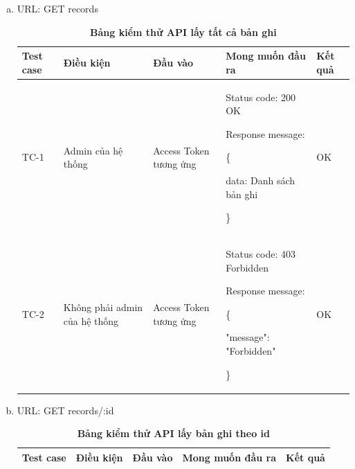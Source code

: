 \begin{enumerate}[a)]
  \item URL: GET records
    \begin{xltabular}{\textwidth}{
    | >{\raggedright\arraybackslash}p{1cm}
    | >{\raggedright\arraybackslash}p{2.5cm}
    | >{\raggedright\arraybackslash}p{2.5cm}
    | >{\raggedright\arraybackslash}X
    | >{\raggedright\arraybackslash}p{1cm}|
    }
    \caption{\bfseries \fontsize{12pt}{0pt}\selectfont Bảng kiểm thử API lấy tất cả bản ghi}
    \\
    \hline
    \bfseries Test case    &\bfseries Điều kiện   &\bfseries Đầu vào 
    &\bfseries Mong muốn đầu ra &\bfseries Kết quả\\ \hline
  
  
    TC-1
    & Admin của hệ thống
    & Access Token tương ứng
  
    & 
  
    Status code: 200 OK
  
      Response message:
  
      \{

    data: Danh sách bản ghi 
  
    \}
    
    & OK
  
    \\ \hline
  
    TC-2
    & Không phải admin của hệ thống
    & Access Token tương ứng
  
    & 
  
    Status code: 403 Forbidden
  
      Response message:
  
      \{

    "message": "Forbidden"
  
    \}
    
    & OK
    \\ \hline

  
    \end{xltabular}
  
  \item URL: GET records/{:id}
    \begin{xltabular}{\textwidth}{
    | >{\raggedright\arraybackslash}p{1cm}
    | >{\raggedright\arraybackslash}p{2.5cm}
    | >{\raggedright\arraybackslash}p{2.5cm}
    | >{\raggedright\arraybackslash}X
    | >{\raggedright\arraybackslash}p{1cm}|
    }
    \caption{\bfseries \fontsize{12pt}{0pt}\selectfont Bảng kiểm thử API lấy bản ghi theo id}
    \\
    \hline
    \bfseries Test case    &\bfseries Điều kiện   &\bfseries Đầu vào 
    &\bfseries Mong muốn đầu ra &\bfseries Kết quả\\ \hline
  

\end{xltabular}
\end{enumerate}
